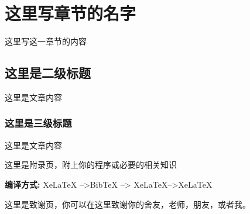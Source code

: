 \documentclass[AutoFakeBold]{LZUThesis}
\begin{document}
\setcounter{chapter}{0}

\chapter{这里写章节的名字}

这里写这一章节的内容

\section{这里是二级标题}
这里是文章内容\cite{tussyadiah2015hotels}

\subsection{这里是三级标题}
这里是文章内容\cite{partl2016}



\backmatter


\printbib


\Appendix


这里是附录页，附上你的程序或必要的相关知识

{\bfseries 编译方式:} XeLaTeX -->BibTeX --> XeLaTeX-->XeLaTeX


\Thanks
这里是致谢页，你可以在这里致谢你的舍友，老师，朋友，或者我。
\end{document}
